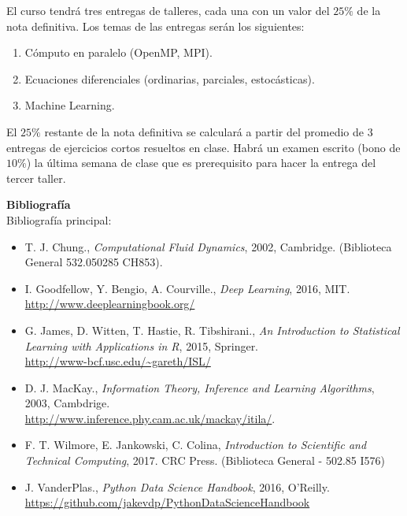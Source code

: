 \documentclass[letterpaper,10pt,onecolumn]{article}
\begin{document}
El curso tendr\'a tres entregas de talleres, cada una con un valor
del $25\%$ de la nota definitiva. Los temas de las entregas ser\'an
los siguientes:
\begin{enumerate}
\item C\'omputo en paralelo (OpenMP, MPI).\\[-0.6cm]
\item Ecuaciones diferenciales (ordinarias, parciales, estoc\'asticas).\\[-0.6cm]
\item Machine Learning.\\[-0.2cm]
\end{enumerate}
\noindent
El $25\%$ restante de la nota definitiva se calcular\'a a partir del
promedio de $3$ entregas de ejercicios cortos resueltos en clase. 
Habr\'a un examen escrito (bono de $10\%$) la \'ultima semana de clase que es
prerequisito para hacer la entrega del tercer taller.  

\newpage
{}
\noindent\textbf{\large {} \quad
  Bibliograf\'ia}\\[-0.2cm] 


\noindent\normalsize Bibliograf\'ia principal:

\begin{itemize}
\item T. J. Chung., \textit{Computational Fluid Dynamics}, 2002,
  Cambridge. (Biblioteca General 532.050285 CH853).
  \\[-0.6cm] 
\item I. Goodfellow, Y. Bengio, A. Courville., \textit{Deep Learning}, 
  2016, MIT.\\
  \url{http://www.deeplearningbook.org/}
  \\[-0.6cm] 
\item G. James, D. Witten, T. Hastie, R. Tibshirani., \textit{An
  Introduction to Statistical Learning with Applications in R}, 2015,
  Springer. \\
  \url{http://www-bcf.usc.edu/~gareth/ISL/} \\[-0.6cm] 
\item D. J. MacKay., \textit{Information Theory, Inference and
  Learning Algorithms}, 2003,
  Cambdrige. \\
  \url{http://www.inference.phy.cam.ac.uk/mackay/itila/}.
  \\[-0.6cm]  
\item F. T. Wilmore, E. Jankowski, C. Colina, \textit{Introduction
  to Scientific and Technical Computing}, 2017. CRC Press. (Biblioteca
  General - 502.85 I576)\\[-0.6cm] 
\item J. VanderPlas., \textit{Python Data Science Handbook}, 2016,
  O'Reilly.\\
  \url{https://github.com/jakevdp/PythonDataScienceHandbook} 
  \\[-0.2cm] 

\end{itemize} 
\end{document}
